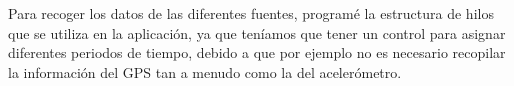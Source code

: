 Para recoger los datos de las diferentes fuentes, programé la estructura de hilos que se utiliza en la aplicación, ya que teníamos que tener un control para asignar diferentes periodos de tiempo, debido a que por ejemplo no es necesario recopilar la información del GPS tan a menudo como la del acelerómetro.

%
%
%






